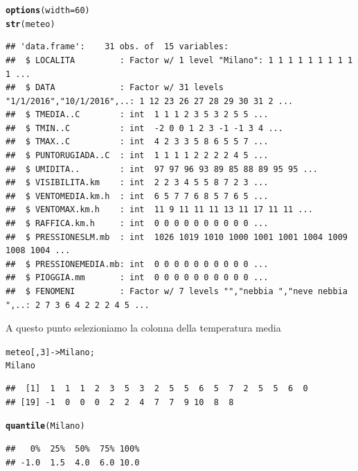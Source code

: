 \documentclass[onecolumn,12pt]{book}\usepackage[]{graphicx}\usepackage[]{color}
\makeatletter
\newcommand{\hlnum}[1]{\textcolor[rgb]{0.686,0.059,0.569}{#1}}%
\newcommand{\hlstd}[1]{\textcolor[rgb]{0.345,0.345,0.345}{#1}}%
\newcommand{\hlkwb}[1]{\textcolor[rgb]{0.69,0.353,0.396}{#1}}%
\newcommand{\hlkwc}[1]{\textcolor[rgb]{0.333,0.667,0.333}{#1}}%
\newcommand{\hlkwd}[1]{\textcolor[rgb]{0.737,0.353,0.396}{\textbf{#1}}}%
\newenvironment{kframe}{%
 \def\at@end@of@kframe{}%
 \ifinner\ifhmode%
  \def\at@end@of@kframe{\end{minipage}}%
  \begin{minipage}{\columnwidth}%
 \fi\fi%
 \def\FrameCommand##1{\hskip\@totalleftmargin \hskip-\fboxsep
 \colorbox{shadecolor}{##1}\hskip-\fboxsep
     \hskip-\linewidth \hskip-\@totalleftmargin \hskip\columnwidth}%
 \MakeFramed {\advance\hsize-\width
   \@totalleftmargin\z@ \linewidth\hsize
   \@setminipage}}%
 {\par\unskip\endMakeFramed%
 \at@end@of@kframe}
\newenvironment{knitrout}{}{} %
\makeatother
\begin{document}
\begin{knitrout}
\color{fgcolor}\begin{kframe}
\begin{alltt}
\hlkwd{options}\hlstd{(}\hlkwc{width} \hlstd{=} \hlnum{60}\hlstd{)}
\hlkwd{str}\hlstd{(meteo)}
\end{alltt}
\begin{verbatim}
## 'data.frame':	31 obs. of  15 variables:
##  $ LOCALITA         : Factor w/ 1 level "Milano": 1 1 1 1 1 1 1 1 1 1 ...
##  $ DATA             : Factor w/ 31 levels "1/1/2016","10/1/2016",..: 1 12 23 26 27 28 29 30 31 2 ...
##  $ TMEDIA..C        : int  1 1 1 2 3 5 3 2 5 5 ...
##  $ TMIN..C          : int  -2 0 0 1 2 3 -1 -1 3 4 ...
##  $ TMAX..C          : int  4 2 3 3 5 8 6 5 5 7 ...
##  $ PUNTORUGIADA..C  : int  1 1 1 1 2 2 2 2 4 5 ...
##  $ UMIDITA..        : int  97 97 96 93 89 85 88 89 95 95 ...
##  $ VISIBILITA.km    : int  2 2 3 4 5 5 8 7 2 3 ...
##  $ VENTOMEDIA.km.h  : int  6 5 7 7 6 8 5 7 6 5 ...
##  $ VENTOMAX.km.h    : int  11 9 11 11 11 13 11 17 11 11 ...
##  $ RAFFICA.km.h     : int  0 0 0 0 0 0 0 0 0 0 ...
##  $ PRESSIONESLM.mb  : int  1026 1019 1010 1000 1001 1001 1004 1009 1008 1004 ...
##  $ PRESSIONEMEDIA.mb: int  0 0 0 0 0 0 0 0 0 0 ...
##  $ PIOGGIA.mm       : int  0 0 0 0 0 0 0 0 0 0 ...
##  $ FENOMENI         : Factor w/ 7 levels "","nebbia ","neve nebbia ",..: 2 7 3 6 4 2 2 2 4 5 ...
\end{verbatim}
\end{kframe}
\end{knitrout}
A questo punto selezioniamo la colonna della temperatura media 
\begin{knitrout}
\color{fgcolor}\begin{kframe}
\begin{alltt}
\hlstd{meteo[,}\hlnum{3}\hlstd{]}\hlkwb{->}\hlstd{Milano;}
\hlstd{Milano}
\end{alltt}
\begin{verbatim}
##  [1]  1  1  1  2  3  5  3  2  5  5  6  5  7  2  5  5  6  0
## [19] -1  0  0  0  2  2  4  7  7  9 10  8  8
\end{verbatim}
\begin{alltt}
\hlkwd{quantile}\hlstd{(Milano)}
\end{alltt}
\begin{verbatim}
##   0%  25%  50%  75% 100% 
## -1.0  1.5  4.0  6.0 10.0
\end{verbatim}
\end{kframe}
\end{knitrout}
\end{document}
